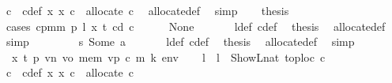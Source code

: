 \begin{isabellebody}
\ c{\isacharprime}{\kern0pt}\ \ c{\isacharunderscore}{\kern0pt}def{\isacharcolon}{\kern0pt}\ {\isachardoublequoteopen}{\isasymexists}x{\isachardot}{\kern0pt}\ {\isacharparenleft}{\kern0pt}x{\isacharcomma}{\kern0pt}\ c{\isacharprime}{\kern0pt}{\isacharparenright}{\kern0pt}\ {\isacharequal}{\kern0pt}\ allocate\ c{\isachardoublequoteclose}\ \isamarkupfalse%
\ allocate{\isacharunderscore}{\kern0pt}def\ \isamarkupfalse%
\ simp\isanewline
\ \ \isamarkupfalse%
\ {\isacharquery}{\kern0pt}thesis\isanewline
\ \ \isamarkupfalse%
\ {\isacharparenleft}{\kern0pt}cases\ {\isachardoublequoteopen}cpm{}m\ p\ l\ x\ t\ cd\ c{\isacharprime}{\kern0pt}{\isachardoublequoteclose}{\isacharparenright}{\kern0pt}\isanewline
\ \ \ \ \isamarkupfalse%
\ None\isanewline
\ \ \ \ \isamarkupfalse%
\ {}\ l{\isacharunderscore}{\kern0pt}def\ c{\isacharunderscore}{\kern0pt}def\ \isamarkupfalse%
\ {\isacharquery}{\kern0pt}thesis\ \isamarkupfalse%
\ allocate{\isacharunderscore}{\kern0pt}def\ \isamarkupfalse%
\ simp\isanewline
\ \ \isamarkupfalse%
\isanewline
\ \ \ \ \isamarkupfalse%
\ s{}{\isacharcolon}{\kern0pt}\ {\isacharparenleft}{\kern0pt}Some\ a{\isacharparenright}{\kern0pt}\isanewline
\ \ \ \ \isamarkupfalse%
\ {}\ l{\isacharunderscore}{\kern0pt}def\ c{\isacharunderscore}{\kern0pt}def\ \isamarkupfalse%
\ {\isacharquery}{\kern0pt}thesis\ \isamarkupfalse%
\ allocate{\isacharunderscore}{\kern0pt}def\ \isamarkupfalse%
\ simp\isanewline
\ \ \isamarkupfalse%
\isanewline
{}\isamarkupfalse%
\isanewline
\ \ \isamarkupfalse%
\ {\isacharparenleft}{\kern0pt}{}{}\ x\ t\ p\ vn\ vo\ mem\ vp\ c\ m\ k\ env{\isacharparenright}{\kern0pt}\isanewline
\ \ \isamarkupfalse%
\ l\ \ {\isachardoublequoteopen}l\ {\isacharequal}{\kern0pt}\ ShowL\isactrlsub n\isactrlsub a\isactrlsub t\ {\isacharparenleft}{\kern0pt}toploc\ c{\isacharparenright}{\kern0pt}{\isachardoublequoteclose}\isanewline
\ \ \isamarkupfalse%
\ c{\isacharprime}{\kern0pt}\ \ c{\isacharunderscore}{\kern0pt}def{\isacharcolon}{\kern0pt}\ {\isachardoublequoteopen}{\isasymexists}x{\isachardot}{\kern0pt}\ {\isacharparenleft}{\kern0pt}x{\isacharcomma}{\kern0pt}\ c{\isacharprime}{\kern0pt}{\isacharparenright}{\kern0pt}\ {\isacharequal}{\kern0pt}\ allocate\ c{\isachardoublequoteclose}\ \isamarkupfalse%

\end{isabellebody}
